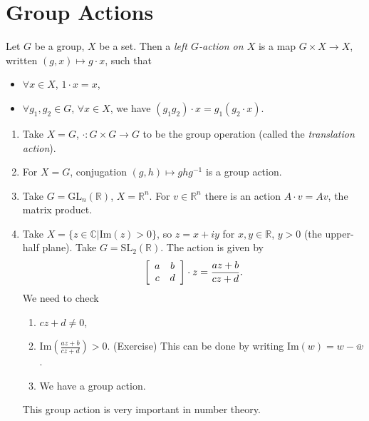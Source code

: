 \section{Group Actions}

\begin{defn}
Let $G$ be a group, $X$ be a set. Then a
\emph{left $G$-action on $X$} is a map
$G \times X \to X$, written $(g,x) \mapsto g \cdot x$, such that
\begin{itemize}
  \item{$\forall x \in X$, $1 \cdot x = x$,}
  \item{$\forall g_1, g_2 \in G$, $\forall x \in X$, we have
        $(g_1 g_2) \cdot x = g_1 (g_2 \cdot x)$.
       }
\end{itemize}
\end{defn}

\begin{xmpl}
\begin{enumerate}
  \item{
        Take $X = G$, $\cdot : G \times G \to G$ to be the group
        operation (called the \emph{translation action}).
       }
  \item{For $X = G$, conjugation $(g, h) \mapsto g h g^{-1}$ is a
        group action.
       }
  \item{Take $G = \mathrm{GL}_n(\mathbb{R})$, $X = \mathbb{R}^n$. For
        $v \in \mathbb{R}^n$ there is an action $A \cdot v = Av$, the
        matrix product.
       }
  \item{Take $X = \{z \in \mathbb{C} | \mathrm{Im}(z) > 0\}$, so
        $z = x + iy$ for $x,y \in \mathbb{R}$, $y > 0$
        (the upper-half plane). Take
        $G = \mathrm{SL}_2(\mathbb{R})$. The action is given by
        $$
        \left[\begin{array}{c c}
          a & b \\ c & d
        \end{array}\right] \cdot z
        = \frac{az + b}{cz + d}.
        $$
        We need to check
        \begin{enumerate}
          \item{$cz + d \neq 0$,
               }
          \item{$\mathrm{Im}\left(\frac{az + b}{cz + d}\right) >
                0$. (Exercise) This can be done by writing
                $\mathrm{Im}(w) = w - \bar{w}$.
               }
          \item{We have a group action.}
        \end{enumerate}
        This group action is very important in number theory.
      }
\end{enumerate}
\end{xmpl}


